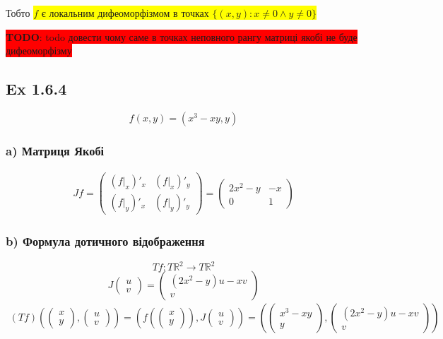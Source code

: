 \documentclass[10pt, a4paper]{article} %
\newcommand{\R}{\mathbb{R}}
\newcommand{\todo}[1]{\colorbox{red}{\textbf{TODO}: #1}}
\begin{document}
Тобто \colorbox{yellow}{$f$ є локальним дифеоморфізмом в точках $\{(x,y) : x\ne 0 \land y \ne 0\}$}

\todo{todo довести чому саме в точках неповного рангу матриці якобі не буде дифеоморфізму}

\subsection*{Ex 1.6.4}
\[f(x,y) = (x^3-xy, y)\]
\subsubsection*{a) Матриця Якобі}
\begin{align*}
    Jf = \begin{pmatrix}
        (f|_x)'_x & (f|_x)'_y\\
        (f|_y)'_x & (f|_y)'_y
    \end{pmatrix} 
    = \begin{pmatrix}
        2x^2-y & -x\\
        0 & 1
    \end{pmatrix}
\end{align*}

\subsubsection*{b) Формула дотичного відображення}
\[Tf : T\R^2 \to T\R^2\]
\[J\begin{pmatrix}u\\v\end{pmatrix} = \begin{pmatrix}(2x^2-y)u-xv\\v\end{pmatrix}\]
\begin{align*}
    (Tf)\left(\begin{pmatrix}x\\y\end{pmatrix} , \begin{pmatrix}u\\v\end{pmatrix}\right)
    = \left(f(\begin{pmatrix}x\\y\end{pmatrix}) , J\begin{pmatrix}u\\v\end{pmatrix}\right)
    = \left(\begin{pmatrix}x^3-xy \\ y\end{pmatrix} , \begin{pmatrix}(2x^2-y)u-xv\\v\end{pmatrix}\right)
\end{align*}
\end{document}
